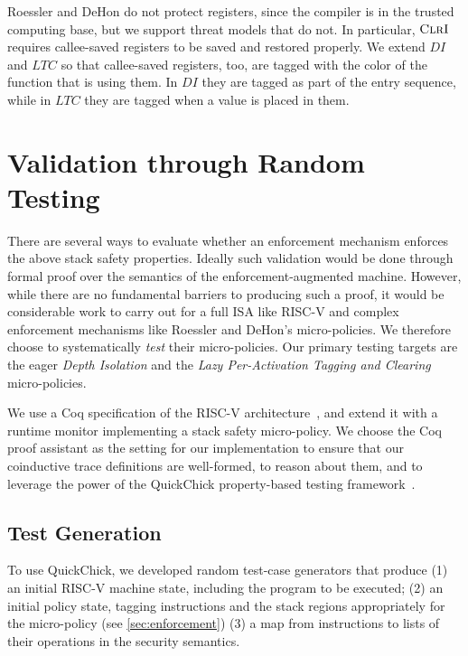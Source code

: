 \documentclass[10pt,conference]{ieeetran}%
\theoremstyle{definition}
\begin{document}
Roessler and DeHon do not protect registers, since the compiler is in the
trusted computing base, but we support threat models that do not.
In particular, \(\textnormal{\sc ClrI}\) requires callee-saved
registers to be saved and restored properly. We extend \(DI\) and \(LTC\)
so that callee-saved registers, too, are tagged with the color of the 
function that is using them. In \(DI\) they are tagged as part of the entry
sequence, while in \(LTC\) they are tagged when a value is placed in them.

\section{Validation through Random Testing}
\label{sec:testing}

There are several ways to evaluate whether an enforcement mechanism enforces the above
stack safety properties. Ideally such validation would be done through formal proof over
the semantics of the enforcement-augmented machine.
However, while there are no fundamental barriers to producing such a proof,
it would be considerable work to carry out for a full ISA like RISC-V and
complex enforcement mechanisms like Roessler and DeHon's micro-policies.
We therefore choose to systematically \emph{test} their micro-policies.
Our primary testing targets are the eager {\em Depth Isolation}
and the {\em Lazy Per-Activation Tagging and Clearing} micro-policies.


We use a Coq specification of the RISC-V architecture~\cite{Bourgeat2021AMF},
and extend it with a runtime monitor implementing a stack safety
micro-policy. We choose the Coq proof assistant as the setting for our implementation
to ensure that our coinductive trace definitions are well-formed, to reason about
them, and to leverage the power of the QuickChick property-based testing framework~\cite{Pierce:SF4}.

\subsection{Test Generation}
To use QuickChick, we developed random test-case generators that produce
(1) an initial RISC-V machine state, including the program to be executed;
(2)
  an initial policy state, tagging instructions and the stack regions appropriately
  for the micro-policy (see \cref{sec:enforcement})
(3)
  a map from instructions to lists of their operations in the security semantics.
\end{document}
